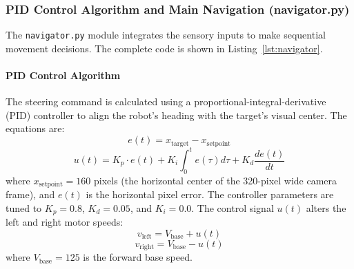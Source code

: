 \subsubsection{PID Control Algorithm and Main Navigation (navigator.py)}
The \texttt{navigator.py} module integrates the sensory inputs to make sequential movement decisions. The complete code is shown in Listing~\ref{lst:navigator}.

\paragraph{PID Control Algorithm}
The steering command is calculated using a proportional-integral-derivative (PID) controller to align the robot's heading with the target's visual center. The equations are:
\begin{equation}
    e(t) = x_{\text{target}} - x_{\text{setpoint}}
    \label{eq:pid_error}
\end{equation}
\begin{equation}
    u(t) = K_p \cdot e(t) + K_i \int_{0}^{t} e(\tau) d\tau + K_d \frac{de(t)}{dt}
    \label{eq:pid_output}
\end{equation}
where $x_{\text{setpoint}} = 160$ pixels (the horizontal center of the 320-pixel wide camera frame), and $e(t)$ is the horizontal pixel error. The controller parameters are tuned to $K_p = 0.8$, $K_d = 0.05$, and $K_i = 0.0$. The control signal $u(t)$ alters the left and right motor speeds:
\begin{equation}
    v_{\text{left}} = V_{\text{base}} + u(t)
    \label{eq:motor_left}
\end{equation}
\begin{equation}
    v_{\text{right}} = V_{\text{base}} - u(t)
    \label{eq:motor_right}
\end{equation}
where $V_{\text{base}} = 125$ is the forward base speed.

